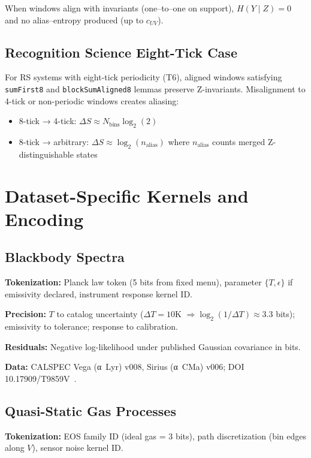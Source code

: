 \documentclass[11pt,letterpaper]{article}
\theoremstyle{definition}
\theoremstyle{remark}
\begin{document}
When windows align with invariants (one--to--one on support), \(H(Y\mid Z)=0\) and no alias--entropy produced (up to \(c_{UV}\)).

\subsection{Recognition Science Eight-Tick Case}

For RS systems with eight-tick periodicity (T6), aligned windows satisfying \texttt{sumFirst8} and \texttt{blockSumAligned8} lemmas preserve Z-invariants. Misalignment to 4-tick or non-periodic windows creates aliasing:
\begin{itemize}
  \item 8-tick → 4-tick: \(\Delta S \approx N_{\text{bins}}\log_2(2)\)
  \item 8-tick → arbitrary: \(\Delta S \approx \log_2(n_{\text{alias}})\) where \(n_{\text{alias}}\) counts merged Z-distinguishable states
\end{itemize}

\section{Dataset-Specific Kernels and Encoding}\label{app:datasets}

\subsection{Blackbody Spectra}

\textbf{Tokenization:} Planck law token (5 bits from fixed menu), parameter \(\{T,\epsilon\}\) if emissivity declared, instrument response kernel ID.

\textbf{Precision:} \(T\) to catalog uncertainty (\(\Delta T=10\)K \(\Rightarrow \log_2(1/\Delta T)\approx 3.3\) bits); emissivity to tolerance; response to calibration.

\textbf{Residuals:} Negative log-likelihood under published Gaussian covariance in bits.

\textbf{Data:} CALSPEC Vega (α~Lyr) v008, Sirius (α~CMa) v006; DOI 10.17909/T9859V~\cite{CALSPEC2021}.

\subsection{Quasi-Static Gas Processes}

\textbf{Tokenization:} EOS family ID (ideal gas = 3 bits), path discretization (bin edges along \(V\)), sensor noise kernel ID.
\end{document}
